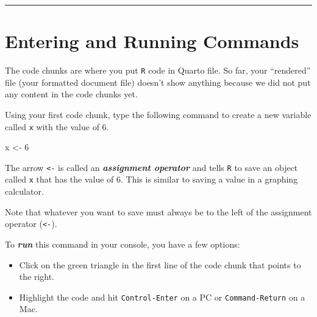 \documentclass[
  letterpaper,
  DIV=11,
  numbers=noendperiod]{scrartcl}
\newenvironment{Shaded}{\begin{snugshade}}{\end{snugshade}}
\newcommand{\DecValTok}[1]{\textcolor[rgb]{0.68,0.00,0.00}{#1}}
\newcommand{\NormalTok}[1]{\textcolor[rgb]{0.00,0.23,0.31}{#1}}
\newcommand{\OtherTok}[1]{\textcolor[rgb]{0.00,0.23,0.31}{#1}}
\providecommand{\tightlist}{%
  \setlength{\itemsep}{0pt}\setlength{\parskip}{0pt}}\usepackage{longtable,booktabs,array}
\begin{document}
\begin{center}\rule{0.5\linewidth}{0.5pt}\end{center}

\hypertarget{entering-and-running-commands}{%
\section{Entering and Running
Commands}\label{entering-and-running-commands}}

The code chunks are where you put \texttt{R} code in Quarto file. So
far, your ``rendered'' file (your formatted document file) doesn't show
anything because we did not put any content in the code chunks yet.

Using your first code chunk, type the following command to create a new
variable called \texttt{x} with the value of 6.

\begin{Shaded}
\begin{Highlighting}[]
\NormalTok{x }\OtherTok{\textless{}{-}} \DecValTok{6}
\end{Highlighting}
\end{Shaded}

The arrow \texttt{\textless{}-} is called an \textbf{\emph{assignment
operator}} and tells \texttt{R} to save an object called \texttt{x} that
has the value of 6. This is similar to saving a value in a graphing
calculator.

\begin{tcolorbox}[enhanced jigsaw, titlerule=0mm, toprule=.15mm, arc=.35mm, colbacktitle=quarto-callout-tip-color!10!white, coltitle=black, colframe=quarto-callout-tip-color-frame, left=2mm, breakable, bottomtitle=1mm, toptitle=1mm, bottomrule=.15mm, title=\textcolor{quarto-callout-tip-color}{\faLightbulb}\hspace{0.5em}{Tip}, colback=white, rightrule=.15mm, opacityback=0, opacitybacktitle=0.6, leftrule=.75mm]

Note that whatever you want to save must always be to the left of the
assignment operator (\texttt{\textless{}-}).

\end{tcolorbox}

To \textbf{\emph{run}} this command in your console, you have a few
options:

\begin{itemize}
\tightlist
\item
  Click on the green triangle in the first line of the code chunk that
  points to the right.
\item
  Highlight the code and hit \texttt{Control-Enter} on a PC or
  \texttt{Command-Return} on a Mac.
\end{itemize}
\end{document}
